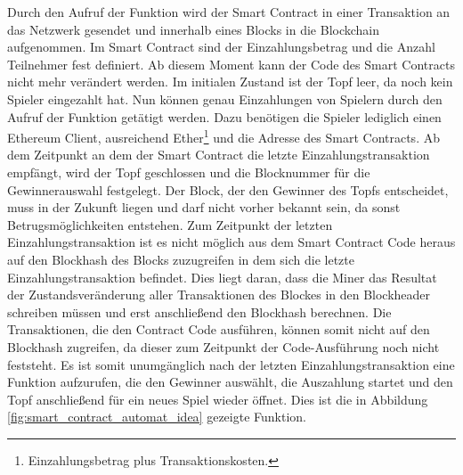 Durch den Aufruf der  Funktion wird der Smart Contract in einer Transaktion an das Netzwerk gesendet und innerhalb eines Blocks in die Blockchain aufgenommen. Im Smart Contract sind der Einzahlungsbetrag und die Anzahl Teilnehmer  fest definiert. Ab diesem Moment kann der Code des Smart Contracts nicht mehr verändert werden. Im initialen Zustand ist der Topf leer, da noch kein Spieler eingezahlt hat. Nun können genau  Einzahlungen von Spielern durch den Aufruf der  Funktion getätigt werden. Dazu benötigen die Spieler lediglich einen Ethereum Client, ausreichend Ether\footnote{Einzahlungsbetrag plus Transaktionskosten.} und die Adresse des Smart Contracts. Ab dem Zeitpunkt an dem der Smart Contract die letzte Einzahlungstransaktion empfängt, wird der Topf geschlossen und die Blocknummer für die Gewinnerauswahl festgelegt. Der Block, der den Gewinner des Topfs entscheidet, muss in der Zukunft liegen und darf nicht vorher bekannt sein, da sonst Betrugsmöglichkeiten entstehen. Zum Zeitpunkt der letzten Einzahlungstransaktion ist es nicht möglich aus dem Smart Contract Code heraus auf den Blockhash des Blocks zuzugreifen in dem sich die letzte Einzahlungstransaktion befindet. Dies liegt daran, dass die Miner das Resultat der Zustandsveränderung aller Transaktionen des Blockes in den Blockheader schreiben müssen und erst anschließend den Blockhash berechnen. Die Transaktionen, die den Contract Code ausführen, können somit nicht auf den Blockhash zugreifen, da dieser zum Zeitpunkt der Code-Ausführung noch nicht feststeht. Es ist somit unumgänglich nach der letzten Einzahlungstransaktion eine Funktion aufzurufen, die den Gewinner auswählt, die Auszahlung startet und den Topf anschließend für ein neues Spiel wieder öffnet. Dies ist die in Abbildung \ref{fig:smart_contract_automat_idea} gezeigte  Funktion.
